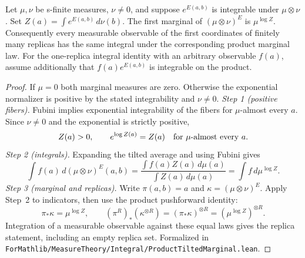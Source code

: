 \begin{lemma}\label{lem:sg-tal:perceptron-auxiliary-marginal}
  \leanok
{}
Let $\mu,\nu$ be s-finite measures, $\nu\ne0$, and suppose $e^{E(a,b)}$ is integrable under
$\mu\otimes\nu$. Set $Z(a)=\int e^{E(a,b)}\,d\nu(b)$.
The first marginal of $(\mu\otimes\nu)^E$ is $\mu^{\log Z}$.
Consequently every measurable observable of the first coordinates of finitely many replicas
has the same integral under the corresponding product marginal law.
For the one-replica integral identity with an arbitrary observable $f(a)$, assume additionally
that $f(a)e^{E(a,b)}$ is integrable on the product.
\end{lemma}
\begin{proof}
  \leanok
If $\mu=0$ both marginal measures are zero. Otherwise the exponential normalizer is positive
by the stated integrability and $\nu\ne0$.
\emph{Step 1 (positive fibers).} Fubini implies exponential integrability of the fibers for
$\mu$-almost every $a$. Since $\nu\ne0$ and the exponential is strictly positive,
\[
 Z(a)>0,\qquad e^{\log Z(a)}=Z(a)\quad\hbox{for $\mu$-almost every $a$}.
\]
\emph{Step 2 (integrals).} Expanding the tilted average and using Fubini gives
\[
 \int f(a)\,d(\mu\otimes\nu)^E(a,b)
 =\frac{\int f(a)Z(a)\,d\mu(a)}{\int Z(a)\,d\mu(a)}
 =\int f\,d\mu^{\log Z}.
\]
\emph{Step 3 (marginal and replicas).} Write $\pi(a,b)=a$ and $\kappa=(\mu\otimes\nu)^E$.
Apply Step~2 to indicators, then use the product pushforward identity:
\[
 \pi_*\kappa=\mu^{\log Z},\qquad
 (\pi^R)_*(\kappa^{\otimes R})=(\pi_*\kappa)^{\otimes R}
 =(\mu^{\log Z})^{\otimes R}.
\]
Integration of a measurable observable against these equal laws gives the replica statement,
including an empty replica set.
Formalized in \texttt{ForMathlib/MeasureTheory/Integral/ProductTiltedMarginal.lean}.
\end{proof}

